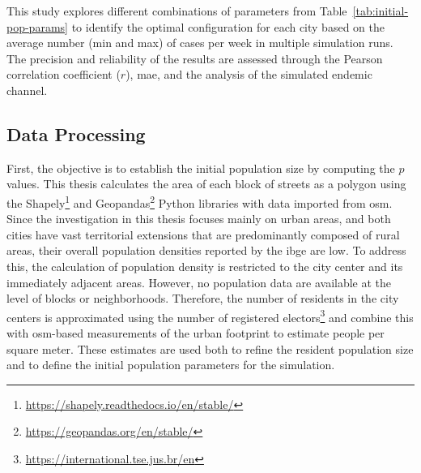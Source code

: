 This study explores different combinations of parameters from Table~\ref{tab:initial-pop-params} to identify the optimal configuration for each city based on the average number (min and max) of cases per week in multiple simulation runs. The precision and reliability of the results are assessed through the Pearson correlation coefficient ($r$), \gls{mae}, and the analysis of the simulated endemic channel.

\begin{table}[ht!]
\centering
\caption{Parameters for the initial state of the simulation.}
\label{tab:initial-pop-params}
\end{table}

\subsection{Data Processing}\label{subsec:data-processing}

First, the objective is to establish the initial population size by computing the $p$ values.
This thesis calculates the area of each block of streets as a polygon using the Shapely\footnote{\url{https://shapely.readthedocs.io/en/stable/}} and Geopandas\footnote{\url{https://geopandas.org/en/stable/}} Python libraries with data imported from \gls{osm}. Since the investigation in this thesis focuses mainly on urban areas, and both cities have vast territorial extensions that are predominantly composed of rural areas, their overall population densities reported by the \gls{ibge} are low. To address this, the calculation of population density is restricted to the city center and its immediately adjacent areas. However, no population data are available at the level of blocks or neighborhoods. Therefore, the number of residents in the city centers is approximated using the number of registered electors\footnote{\url{https://international.tse.jus.br/en}} and combine this with \gls{osm}-based measurements of the urban footprint to estimate people per square meter. These estimates are used both to refine the resident population size and to define the initial population parameters for the simulation.

